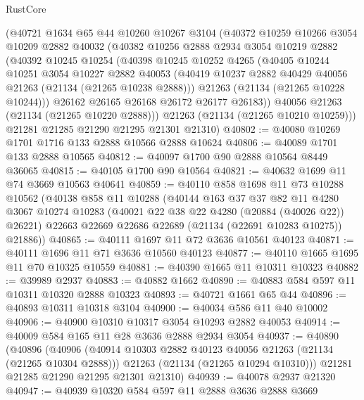 \begin{lexlean}{RustCore}
\begin{coremodule}
    (@40721
      @1634
      @65
      @44
      @10260
      @10267
      @3104
      (@40372
        @10259
        @10266
        @3054
        @10209
        @2882
        @40032
        (@40382
          @10256
          @2888
          @2934
          @3054
          @10219
          @2882
          (@40392
            @10245
            @10254
            (@40398
              @10245
              @10252
              @4265
              (@40405
                @10244
                @10251
                @3054
                @10227
                @2882
                @40053
                (@40419 @10237 @2882 @40429 @40056 @21263 (@21134 (@21265 @10238 @2888)))
                @21263
                (@21134 (@21265 @10228 @10244)))
              @26162
              @26165
              @26168
              @26172
              @26177
              @26183))
          @40056
          @21263
          (@21134 (@21265 @10220 @2888)))
        @21263
        (@21134 (@21265 @10210 @10259)))
      @21281
      @21285
      @21290
      @21295
      @21301
      @21310)
@40802 := @40080 @10269 @1701 @1716 @133 @2888 @10566 @2888 @10624
@40806 := @40089 @1701 @133 @2888 @10565
@40812 := @40097 @1700 @90 @2888 @10564 @8449 @36065
@40815 := @40105 @1700 @90 @10564
@40821 := @40632 @1699 @11 @74 @3669 @10563 @40641
@40859 := @40110
    @858
    @1698
    @11
    @73
    @10288
    @10562
    (@40138
      @858
      @11
      @10288
      (@40144
        @163
        @37
        @37
        @82
        @11
        @4280
        @3067
        @10274
        @10283
        (@40021 @22 @38 @22 @4280 (@20884 (@40026 @22)) @26221)
        @22663
        @22669
        @22686
        @22689
        (@21134 (@22691 @10283 @10275))
        @21886))
@40865 := @40111 @1697 @11 @72 @3636 @10561 @40123
@40871 := @40111 @1696 @11 @71 @3636 @10560 @40123
@40877 := @40110 @1665 @1695 @11 @70 @10325 @10559
@40881 := @40390 @1665 @11 @10311 @10323
@40882 := @39989 @2937
@40883 := @40882 @1662
@40890 := @40883 @584 @597 @11 @10311 @10320 @2888 @10323
@40893 := @40721 @1661 @65 @44
@40896 := @40893 @10311 @10318 @3104
@40900 := @40034 @586 @11 @40 @10002
@40906 := @40900 @10310 @10317 @3054 @10293 @2882 @40053
@40914 := @40009 @584 @165 @11 @28 @3636 @2888 @2934 @3054
@40937 := @40890
    (@40896
      (@40906
        (@40914 @10303 @2882 @40123 @40056 @21263 (@21134 (@21265 @10304 @2888)))
        @21263
        (@21134 (@21265 @10294 @10310)))
      @21281
      @21285
      @21290
      @21295
      @21301
      @21310)
@40939 := @40078 @2937 @21320
@40947 := @40939 @10320 @584 @597 @11 @2888 @3636 @2888 @3669

\end{coremodule}
\end{lexlean}
